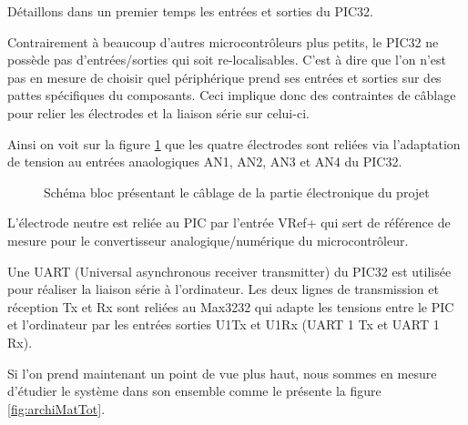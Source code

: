 \documentclass[letterpaper, twoside, 12pt, memoire, creativecommons, hyperref]{thETS}
\begin{document}
Détaillons dans un premier temps les entrées et sorties du PIC32. 

Contrairement à beaucoup d'autres microcontrôleurs plus petits, le PIC32 ne possède pas d'entrées/sorties qui soit re-localisables. C'est à dire que l'on n'est pas en mesure de choisir quel périphérique prend ses entrées et sorties sur des pattes spécifiques du composants. Ceci implique donc des contraintes de câblage pour relier les électrodes et la liaison série sur celui-ci. 

Ainsi on voit sur la figure \ref{fig:cablagePic} que les quatre électrodes sont reliées via l'adaptation de tension au entrées anaologiques AN1, AN2, AN3 et AN4 du PIC32. 

\begin{figure}
	\centering
	\caption{Schéma bloc présentant le câblage de la partie électronique du projet}
	\label{fig:cablagePic}
\end{figure}

L'électrode neutre est reliée au PIC par l'entrée VRef+ qui sert de référence de mesure pour le convertisseur analogique/numérique du microcontrôleur. 

Une UART (Universal asynchronous receiver transmitter) du PIC32 est utilisée pour réaliser la liaison série à l'ordinateur. Les deux lignes de transmission et réception Tx et Rx sont reliées au Max3232 qui adapte les tensions entre le PIC et l'ordinateur par les entrées sorties U1Tx et U1Rx (UART 1 Tx et UART 1 Rx).

Si l'on prend maintenant un point de vue plus haut, nous sommes en mesure d'étudier le système dans son ensemble comme le présente la figure \ref{fig:archiMatTot}.
\end{document}
